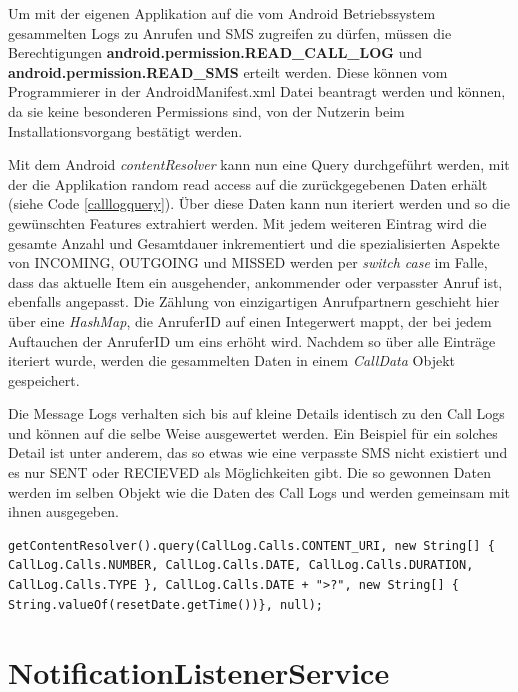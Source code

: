 Um mit der eigenen Applikation auf die vom Android Betriebssystem gesammelten Logs zu Anrufen und SMS zugreifen zu dürfen, müssen die Berechtigungen 
\textbf{android.permission.READ\_CALL\_LOG} und \textbf{android.permission.READ\_SMS} erteilt werden.
Diese können vom Programmierer in der AndroidManifest.xml Datei beantragt werden und können, da sie keine besonderen Permissions sind,
von der Nutzerin beim Installationsvorgang bestätigt werden.
\par
Mit dem Android \emph{contentResolver} kann nun eine Query durchgeführt werden, mit der die Applikation random read access auf die zurückgegebenen Daten erhält (siehe Code \ref{calllogquery}).
Über diese Daten kann nun iteriert werden und so die gewünschten Features extrahiert werden.
Mit jedem weiteren Eintrag wird die gesamte Anzahl und Gesamtdauer inkrementiert und die spezialisierten Aspekte von INCOMING, OUTGOING und MISSED werden per \emph{switch case} im Falle, dass das aktuelle Item ein ausgehender, ankommender oder verpasster Anruf ist, ebenfalls angepasst.
Die Zählung von einzigartigen Anrufpartnern geschieht hier über eine \emph{HashMap}, die AnruferID auf einen Integerwert mappt, der bei jedem Auftauchen der AnruferID um eins erhöht wird.
Nachdem so über alle Einträge iteriert wurde, werden die gesammelten Daten in einem \emph{CallData} Objekt gespeichert.
\par

Die Message Logs verhalten sich bis auf kleine Details identisch zu den Call Logs und können auf die selbe Weise ausgewertet werden.
Ein Beispiel für ein solches Detail ist unter anderem, das so etwas wie eine verpasste SMS nicht existiert und es nur SENT oder RECIEVED als Möglichkeiten gibt.
Die so gewonnen Daten werden im selben Objekt wie die Daten des Call Logs und werden gemeinsam mit ihnen ausgegeben.

\begin{lstlisting}[frame=single, caption = Call Log Query, label=calllogquery] 
  getContentResolver().query(CallLog.Calls.CONTENT_URI, new String[] { CallLog.Calls.NUMBER, CallLog.Calls.DATE, CallLog.Calls.DURATION, CallLog.Calls.TYPE }, CallLog.Calls.DATE + ">?", new String[] { String.valueOf(resetDate.getTime())}, null);
\end{lstlisting}

\section{NotificationListenerService}

